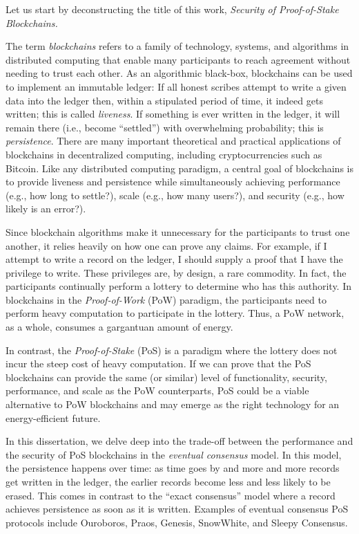 Let us start by deconstructing the title of this work, 
\emph{Security of Proof-of-Stake Blockchains.}

The term \emph{blockchains} refers to a family of technology, systems, and algorithms 
in distributed computing 
that enable 
many participants to reach agreement without needing to trust each other. 
As an algorithmic black-box, blockchains can be used to implement an immutable ledger: 
If all honest scribes attempt to write a given data into the ledger then, within a stipulated period of time, 
it indeed gets written; this is called \emph{liveness}. 
If something is ever written in the ledger, it will remain there (i.e., become ``settled'') with overwhelming probability; 
this is \emph{persistence}. 
There are many important theoretical and practical applications of blockchains 
in decentralized computing, including cryptocurrencies such as Bitcoin.
Like any distributed computing paradigm, 
a central goal of blockchains is to provide liveness and persistence 
while simultaneously achieving 
performance (e.g., how long to settle?), 
scale (e.g., how many users?), and 
security (e.g., how likely is an error?). 

Since blockchain algorithms make it unnecessary 
for the participants to trust one another, 
it relies heavily on how one can prove any claims. 
For example, if I attempt to write a record on the ledger, 
I should supply a proof that I have the privilege to write. 
These privileges are, by design, a rare commodity. 
In fact, the participants continually perform a lottery to determine 
who has this authority. 
In blockchains in the \emph{Proof-of-Work} (PoW) paradigm, 
the participants need to 
perform heavy computation to participate in the lottery. 
Thus, a PoW network, as a whole, consumes 
a gargantuan amount of energy.

In contrast, the \emph{Proof-of-Stake} (PoS) is a paradigm where 
the lottery does not incur the steep cost of heavy computation. 
If we can prove that the PoS blockchains can provide the same (or similar) level of 
functionality, security, performance, and scale as the PoW counterparts, 
PoS could be a viable alternative to PoW blockchains 
and may emerge as the right technology for an energy-efficient future.

In this dissertation, 
we delve deep into the trade-off between the performance and the security of PoS blockchains 
in the \emph{eventual consensus} model. 
In this model, 
the persistence happens over time: 
as time goes by and more and more records get written in the ledger, 
the earlier records become less and less likely to be erased. 
This comes in contrast to the ``exact consensus'' model 
where a record achieves persistence as soon as it is written. 
Examples of eventual consensus PoS protocols include Ouroboros, Praos, Genesis, SnowWhite, 
and Sleepy Consensus.






